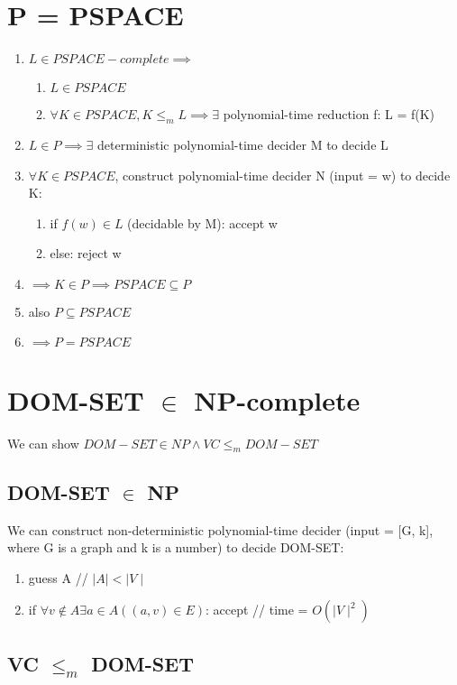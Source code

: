 \documentclass{article}
\begin{document}
\section{P = PSPACE}
\begin{enumerate}
	\item $ L \in PSPACE-complete \implies $
	\begin{enumerate}
		\item $ L \in PSPACE $
		\item $ \forall K \in PSPACE, K \leq_m L \implies \exists $ 
		polynomial-time reduction f: L = f(K)
	\end{enumerate}
	\item $ L \in P \implies \exists $ deterministic polynomial-time decider M 
	to decide L
	\item $ \forall K \in PSPACE $, construct polynomial-time decider N (input 
	= w) to decide K:
	\begin{enumerate}
		\item if $ f(w) \in L $ (decidable by M): accept w
		\item else: reject w
	\end{enumerate}
	\item $ \implies K \in P \implies PSPACE \subseteq P $
	\item also $ P \subseteq PSPACE $
	\item $ \implies P = PSPACE $
\end{enumerate}

\section{DOM-SET $ \in $ NP-complete}

We can show $ DOM-SET \in NP \land VC \leq_m DOM-SET $

\subsection{DOM-SET $ \in $ NP}
We can construct non-deterministic polynomial-time decider (input = [G, k], 
where G is a graph and k is a number) to decide DOM-SET:
\begin{enumerate}
	\item guess A // $ \mid A \mid < 
	\mid V \mid $
	\item if $ \forall v \notin A \exists a \in A ((a, v) \in E) $: accept // 
	time = $ O(\mid V \mid ^2) $
\end{enumerate}

\subsection{VC $ \leq_m $ DOM-SET}
\end{document}

